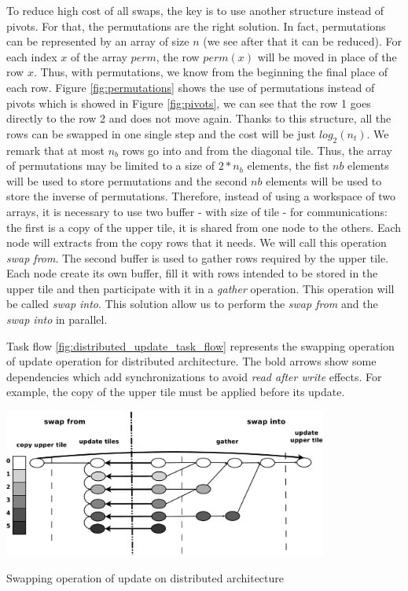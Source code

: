 To reduce high cost of all swaps, the key is to use another structure instead of pivots. For that, the permutations are the right solution. In fact, permutations can be represented by an array of size $n$ (we see after that it can be reduced). For each index $x$ of the array $perm$, the row $perm(x)$ will be moved in place of the row $x$. Thus, with permutations, we know from the beginning the final place of each row. 
Figure \ref{fig:permutations} shows the use of permutations instead of pivots which is showed in Figure \ref{fig:pivots}, we can see that the row 1 goes directly to the row 2 and does	 not move again.
Thanks to this structure, all the rows can be swapped in one single step and the cost will be just $log_2(n_t)$. 
We remark that at most $n_b$ rows go into and from the diagonal tile. Thus, the array of permutations may be limited to a size of $2*n_b$ elements, the fist $nb$ elements will be used to store permutations and the second $nb$ elements will be used to store the inverse of permutations. Therefore, instead of using a workspace of two arrays, it is necessary to use two buffer - with size of tile - for communications: the first is a copy of the upper tile, it is shared from one node to the others. Each node will extracts from the copy rows that it needs. We will call this operation \emph{swap from}. The second buffer is used to gather rows required by the upper tile. Each node create its own buffer, fill it with rows intended to be stored in the upper tile and then participate with it in a \textit{gather} operation. This operation will be called \emph{swap into}. This solution allow us to perform the \emph{swap from} and the \emph{swap into} in parallel.

Task flow \ref{fig:distributed_update_task_flow} represents the swapping operation of update operation for distributed architecture. The bold arrows show some dependencies which add synchronizations to avoid \emph{read after write} effects. For example, the copy of the upper tile must be applied before its update.

\begin{taskflow}[!ht]
\centering
\includegraphics[width=0.8\textwidth]{figures/distributed_update_tf_bw.pdf}
\caption{Swapping operation of update on distributed architecture \label{fig:distributed_update_task_flow}}
\end{taskflow}


